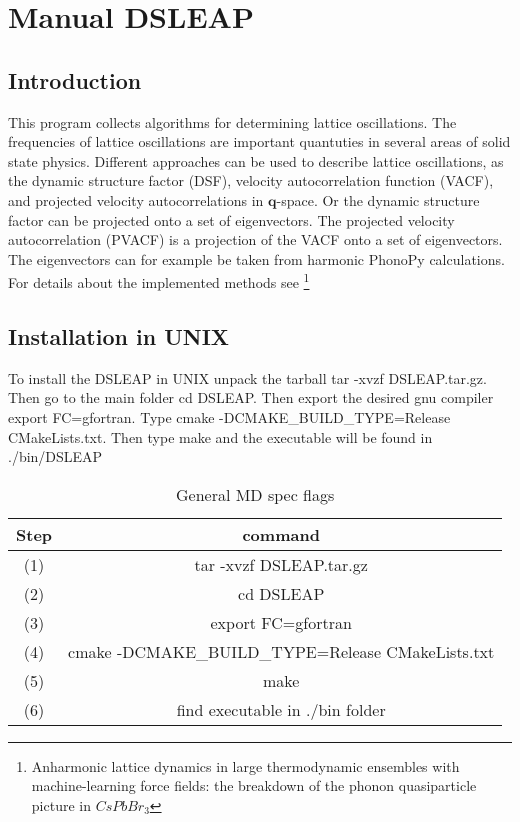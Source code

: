 \documentclass[a4paper,12pt]{article}
\begin{document}
\pagestyle{fancy}



\section{Manual DSLEAP}
\subsection{Introduction}
This program collects algorithms for determining lattice oscillations.
The frequencies of lattice oscillations are important quantuties
in several areas of solid state physics.
Different approaches can be used to describe lattice oscillations, as
the dynamic structure factor (DSF), velocity autocorrelation function
(VACF), and projected velocity autocorrelations in $\mathbf{q}$-space.
Or the dynamic structure factor can be projected onto a set of
eigenvectors. The projected velocity autocorrelation (PVACF) is a projection
of the VACF onto a set of eigenvectors. The eigenvectors can for example
be taken from harmonic PhonoPy calculations.
For details about the implemented methods see \footnote[1]{Anharmonic lattice
dynamics in large thermodynamic ensembles with machine-learning force fields:
the breakdown of the phonon quasiparticle picture in $\textit{CsPbBr}_{3}$}




\subsection{Installation in UNIX}
To install the DSLEAP in UNIX unpack the tarball
tar -xvzf DSLEAP.tar.gz. Then go to the main folder
cd DSLEAP. Then export the desired gnu compiler
export FC=gfortran. Type cmake -DCMAKE\_BUILD\_TYPE=Release CMakeLists.txt.
Then type make and the executable will be found in ./bin/DSLEAP

\begin{table}[h!]
	\centering
	\caption{General MD spec flags}
\begin{tabular}{ |c|c| }
 \hline
	Step & command \\ 
 \hline
	(1) & tar -xvzf DSLEAP.tar.gz \\  
	(2) & cd DSLEAP \\
	(3) & export FC=gfortran \\
	(4) & cmake -DCMAKE\_BUILD\_TYPE=Release CMakeLists.txt \\
	(5) & make \\
	(6) & find executable in ./bin folder \\
 \hline
\end{tabular}
\end{table}
\end{document}
